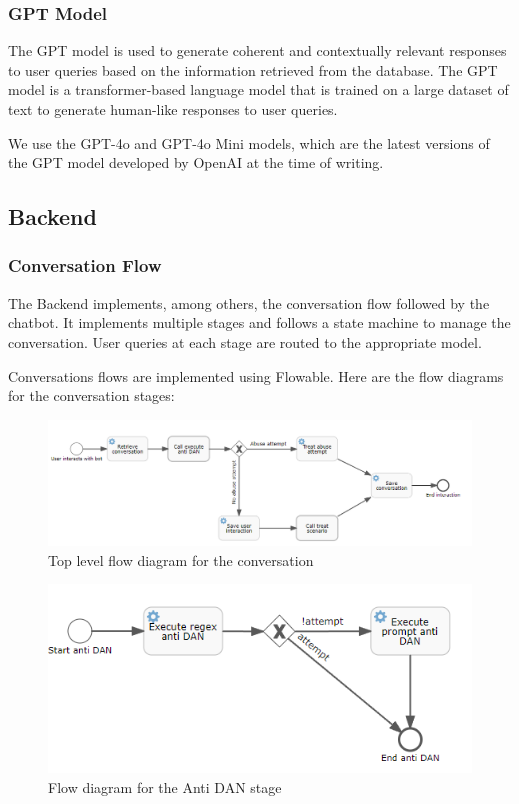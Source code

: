 \documentclass[a4paper,12pt,twoside]{ThesisStyle}
\begin{document}
\subsubsection{GPT Model}

The GPT model is used to generate coherent and contextually relevant responses to user queries based on the information retrieved from the database. The GPT model is a transformer-based \cite{Vaswani2023AttentionNeed} language model that is trained on a large dataset of text to generate human-like responses to user queries.

We use the GPT-4o and GPT-4o Mini models, which are the latest versions of the GPT model developed by OpenAI at the time of writing.

\subsection{Backend}

\subsubsection{Conversation Flow}

The Backend implements, among others, the conversation flow followed by the chatbot. It implements multiple stages and follows a state machine to manage the conversation. User queries at each stage are routed to the appropriate model.

Conversations flows are implemented using Flowable. Here are the flow diagrams for the conversation stages:


\begin{figure}[htb]
  \label{fig:conversation}
  \centering
  \includegraphics[width=1\textwidth]{imatges/0_DsoConversation.png}
  \caption{Top level flow diagram for the conversation}
\end{figure}

\begin{figure}[htb]
  \centering
  \includegraphics[width=1\textwidth]{imatges/1_DsoExecuteAntiDAN.png}
  \caption{Flow diagram for the Anti DAN stage}
  \label{fig:antidan}
\end{figure}
\end{document}
